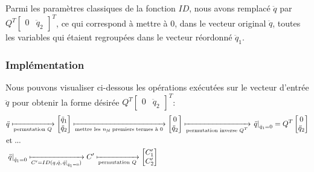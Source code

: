 \documentclass{report}
\begin{document}

Parmi les paramètres classiques de la fonction $ID$, nous avons remplacé $\ddot{q}$ par 
\(Q^T \begin{bmatrix} 0 & \ddot{q}_2 \end{bmatrix}^T\), 
ce qui correspond à mettre à 0, dans le vecteur original $\ddot{q}$, toutes les variables qui étaient regroupées dans le vecteur réordonné $\ddot{q}_1$.\\


\subsubsection{Implémentation}

Nous pouvons visualiser ci-dessous les opérations exécutées sur le vecteur d'entrée $\ddot{q}$ pour obtenir la forme désirée \(Q^T \begin{bmatrix} 0 & \ddot{q}_2 \end{bmatrix}^T\):
\begin{align*}
&\ddot{q} \xmapsto[\textnormal{permutation $Q$}]{} 
\begin{bmatrix}
  \ddot{q}_1 \\
  \ddot{q}_2
\end{bmatrix}
\xmapsto[\textnormal{mettre les $n_{\emph{fd}}$ premiers termes à 0}]{} 
\begin{bmatrix}
  0 \\
  \ddot{q}_2
\end{bmatrix}
\xmapsto[\textnormal{permutation inverse $Q^T$}]{} 
\left. \ddot{q} \right\vert_{\ddot{q}_1=0} = Q^T
\begin{bmatrix}
  0 \\
  \ddot{q}_2
\end{bmatrix} \\
\medskip
&\textnormal{et ...} \\
&\left. \ddot{q} \right\vert_{\ddot{q}_1=0} \xmapsto[C'=ID(q,\dot{q},\left. \ddot{q} \right\vert_{\ddot{q}_1=0})]{} C'
\xmapsto[\textnormal{permutation $Q$}]{} 
\begin{bmatrix}
  C'_1 \\
  C'_2
\end{bmatrix}
\end{align*}
\end{document}
